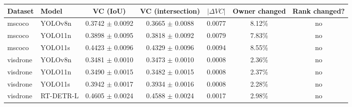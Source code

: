 \begin{tabular}{llccccc}
\toprule
Dataset & Model & VC (IoU) & VC (intersection) & $|\Delta VC|$ & Owner changed & Rank changed? \\
\midrule
mscoco & YOLOv8n & 0.3742 $\pm$ 0.0092 & 0.3665 $\pm$ 0.0088 & 0.0077 & 8.12\% & no \\
mscoco & YOLO11n & 0.3898 $\pm$ 0.0095 & 0.3818 $\pm$ 0.0092 & 0.0079 & 7.83\% & no \\
mscoco & YOLO11s & 0.4423 $\pm$ 0.0096 & 0.4329 $\pm$ 0.0096 & 0.0094 & 8.55\% & no \\
visdrone & YOLOv8n & 0.3481 $\pm$ 0.0010 & 0.3473 $\pm$ 0.0010 & 0.0008 & 2.36\% & no \\
visdrone & YOLO11n & 0.3490 $\pm$ 0.0015 & 0.3482 $\pm$ 0.0015 & 0.0008 & 2.37\% & no \\
visdrone & YOLO11s & 0.3942 $\pm$ 0.0017 & 0.3934 $\pm$ 0.0016 & 0.0008 & 2.28\% & no \\
visdrone & RT-DETR-L & 0.4605 $\pm$ 0.0024 & 0.4588 $\pm$ 0.0024 & 0.0017 & 2.98\% & no \\
\bottomrule
\end{tabular}
